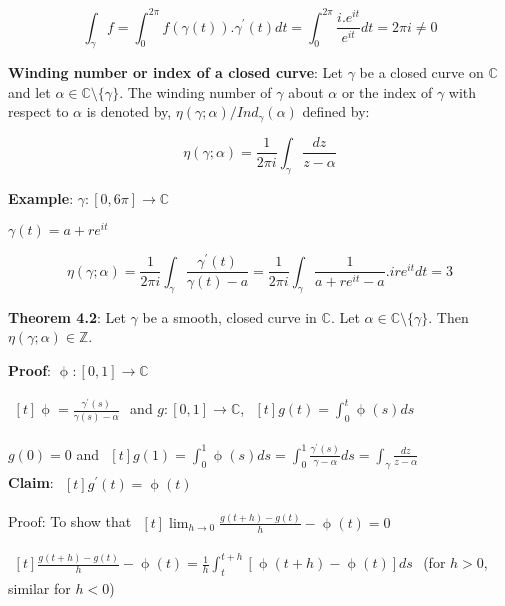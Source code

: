 \documentclass{article}
\begin{document}
\begin{flushleft}
$$\int_{\gamma}^{} f= \int_{0}^{2\pi} f(\gamma(t)).\gamma^{'}(t) dt= \int_{0}^{2\pi} \frac{i.e^{it}}{e^{it}} dt =2\pi i\neq 0$$

\textbf{Winding number or index of a closed curve}:
Let $\gamma$ be a closed curve on $\mathds{C}$ and let $\alpha \in \mathds{C}\setminus \{\gamma\}$. The winding number of $\gamma$ about $\alpha$ or the index of $\gamma$ with respect to $\alpha$ is denoted by,
$\eta(\gamma;\alpha)/Ind_{\gamma}(\alpha)$ defined by:

$$\eta(\gamma;\alpha)=\frac{1}{2\pi i}\int_{\gamma}^{}\frac{dz}{z-\alpha}$$

\textbf{Example}: $\gamma: [0,6\pi]\rightarrow \mathds{C}$ 

$\gamma(t)=a+re^{it}$ 

$$\eta(\gamma;\alpha)=\frac{1}{2\pi i}\int_{\gamma}^{} \frac{\gamma^{'}(t)}{\gamma(t)-a}=\frac{1}{2\pi i}\int_{\gamma}^{} \frac{1}{a+re^{it}-a}.ire^{it} dt=3$$

\textbf{Theorem 4.2}: Let $\gamma$ be a smooth, closed curve in $\mathds{C}$. Let $\alpha\in \mathds{C}\setminus \{\gamma\}$. Then $\eta(\gamma;\alpha)\in \mathds{Z}$.

\textbf{Proof}: $\upphi:[0,1] \rightarrow \mathds{C}$

$\begin{aligned}[t] \upphi= \frac{\gamma^{'}(s)}{\gamma(s)-\alpha} \end{aligned}$ and $g:[0,1]\rightarrow \mathds{C}$, $\begin{aligned}[t]g(t)=\int_{0}^{t} \upphi(s) ds\end{aligned}$

$g(0)=0$ and $\begin{aligned}[t] g(1)=\int_{0}^{1} \upphi(s) ds= \int_{0}^{1} \frac{\gamma^{'}(s)}{\gamma-\alpha} ds= \int_{\gamma}^{} \frac{dz}{z-\alpha} \end{aligned}$\\
\vspace{2mm}
\textbf{Claim}: $\begin{aligned}[t] g^{'}(t)=\upphi(t) \end{aligned}$

Proof: To show that $\begin{aligned}[t] \lim_{h \to 0}\frac{g(t+h)-g(t)}{h}-\upphi(t)=0 \end{aligned}$

$\begin{aligned}[t] \frac{g(t+h)-g(t)}{h}-\upphi(t)=\frac{1}{h}\int_{t}^{t+h}[\upphi(t+h)-\upphi(t)] ds \end{aligned}$ \:(for $h>0$, similar for $h<0$)


\end{flushleft}
\end{document}
